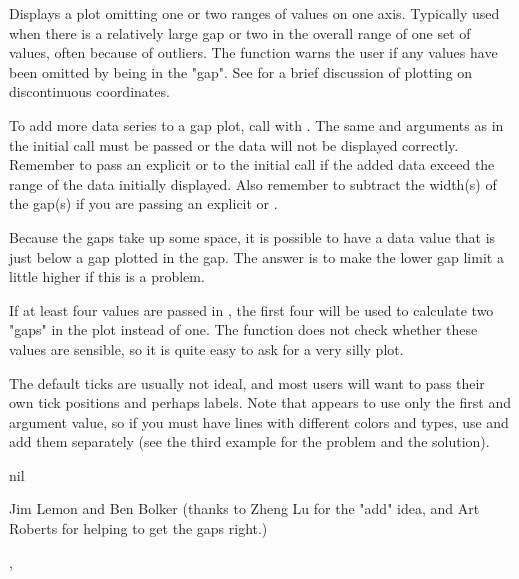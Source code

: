 \begin{Details}\relax
Displays a plot omitting one or two ranges of values on one axis. 
Typically used when there is a relatively large gap or two in the overall 
range of one set of values, often because of outliers. The function warns
the user if any values have been omitted by being in the "gap". See 
 for a brief discussion of plotting on 
discontinuous coordinates.

To add more data series to a gap plot, call  with
. The same  and  arguments as
in the initial call must be passed or the data will not be displayed
correctly. Remember to pass an explicit  or  to
the initial call if the added data exceed the range of the data
initially displayed. Also remember to subtract the width(s) of the gap(s)
if you are passing an explicit  or .

Because the gaps take up some space, it is possible to have a data value
that is just below a gap plotted in the gap. The answer is to make the lower
gap limit a little higher if this is a problem.

If at least four values are passed in , the first four will be
used to calculate two "gaps" in the plot instead of one. The function does
not check whether these values are sensible, so it is quite easy to
ask for a very silly plot.

The default ticks are usually not ideal, and most users will want to pass
their own tick positions and perhaps labels. Note that  appears
to use only the first  and  argument value, so if you
must have lines with different colors and types, use  and add
them separately (see the third example for the problem and the solution).
\end{Details}
\begin{Value}
nil
\end{Value}
\begin{Author}\relax
Jim Lemon and Ben Bolker (thanks to Zheng Lu for the "add" idea,
and Art Roberts for helping to get the gaps right.)
\end{Author}
\begin{SeeAlso}\relax
{}, 
\end{SeeAlso}
